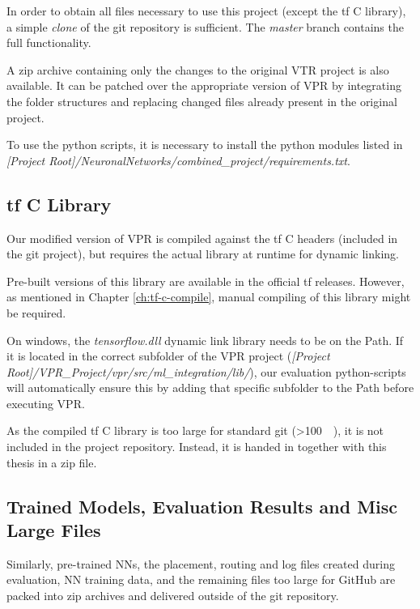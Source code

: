 In order to obtain all files necessary to use this project (except the \gls{tf} C library), a simple \textit{clone} of the git repository is sufficient. The \textit{master} branch contains the full functionality.

A zip archive containing only the changes to the original \gls{VTR} project is also available. It can be patched over the appropriate version of \gls{VPR} by integrating the folder structures and replacing changed files already present in the original project.

To use the python scripts, it is necessary to install the python modules listed in \textit{[Project Root]/NeuronalNetworks/combined\_project/requirements.txt}.

\subsection{\gls{tf} C Library}

Our modified version of \gls{VPR} is compiled against the \gls{tf} C headers (included in the git project), but requires the actual library at runtime for dynamic linking.

Pre-built versions of this library are available in the official \gls{tf} releases. However, as mentioned in Chapter \ref{ch:tf-c-compile}, manual compiling of this library might be required.

On windows, the \textit{tensorflow.dll} dynamic link library needs to be on the Path. If it is located in the correct subfolder of the \gls{VPR} project (\textit{[Project Root]/VPR\_Project/vpr/src/ml\_integration/lib/}), our evaluation python-scripts will automatically ensure this by adding that specific subfolder to the Path before executing \gls{VPR}.

As the compiled \gls{tf} C library is too large for standard git (>\SI{100}{\mega\byte}), it is not included in the project repository. Instead, it is handed in together with this thesis in a zip file.

\subsection{Trained Models, Evaluation Results and Misc Large Files}

Similarly, pre-trained \glspl{NN}, the placement, routing and log files created during evaluation, \gls{NN} training data, and the remaining files too large for GitHub are packed into zip archives and delivered outside of the git repository.

